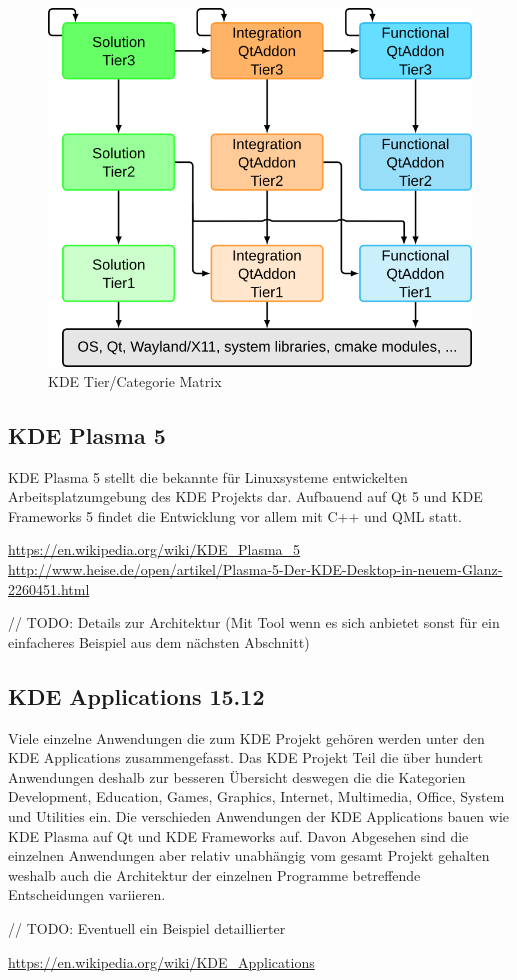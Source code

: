 \begin{figure}[h]
	\centering
	\includegraphics[width=0.9\columnwidth]{images/kf5_no_tier4_big.png}
	\caption{KDE Tier/Categorie Matrix}
	\label{fig:kde_matrix}
\end{figure}

\subsection{KDE Plasma 5}
KDE Plasma 5 stellt die bekannte für Linuxsysteme entwickelten Arbeitsplatzumgebung des KDE Projekts dar. Aufbauend auf Qt 5 und KDE Frameworks 5 findet die Entwicklung vor allem mit C++ und QML statt. 

\url{https://en.wikipedia.org/wiki/KDE_Plasma_5}
\url{http://www.heise.de/open/artikel/Plasma-5-Der-KDE-Desktop-in-neuem-Glanz-2260451.html}

// TODO: Details zur Architektur (Mit Tool wenn es sich anbietet sonst für ein einfacheres Beispiel aus dem nächsten Abschnitt)

\subsection{KDE Applications 15.12}
Viele einzelne Anwendungen die zum KDE Projekt gehören werden unter den KDE Applications zusammengefasst. Das KDE Projekt Teil die über hundert Anwendungen deshalb zur besseren Übersicht deswegen die die Kategorien Development, Education, Games, Graphics, Internet, Multimedia, Office, System und Utilities ein. Die verschieden Anwendungen der KDE Applications bauen wie KDE Plasma auf Qt und KDE Frameworks auf. Davon Abgesehen sind die einzelnen Anwendungen aber relativ unabhängig vom gesamt Projekt gehalten weshalb auch die Architektur der einzelnen Programme betreffende Entscheidungen variieren. 

// TODO: Eventuell ein Beispiel detaillierter

\url{https://en.wikipedia.org/wiki/KDE_Applications}

%